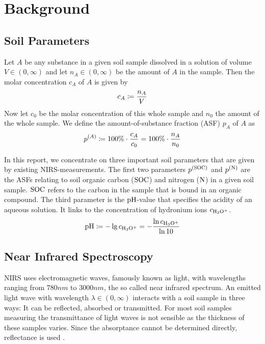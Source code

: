 \section{Background}
\label{sec:background}
	
	\subsection{Soil Parameters}
	\label{ssec:soil-parameters}
	
		Let $A$ be any substance in a given soil sample dissolved in a solution of volume $V\in(0,\infty)$ and let $n_A\in(0,\infty)$ be the amount of $A$ in the sample.
		Then the molar concentration $c_A$ of $A$ is given by
		\[
			c_A \coloneqq \frac{n_A}{V}
		\]
		Now let $c_0$ be the molar concentration of this whole sample and $n_0$ the amount of the whole sample.
		We define the amount-of-substance fraction (ASF) $p_A$ of $A$ as 
		\[
			p^{(A)} \coloneqq 100\%\cdot\frac{c_A}{c_0} = 100\% \cdot\frac{n_A}{n_0}
		\]

		In this report, we concentrate on three important soil parameters that are given by existing NIRS-measurements. \cite{agelet:10a, don:a}
		The first two parameters $p^{\mathrm{(SOC)}}$ and $p^{\mathrm{(N)}}$ are the ASFs relating to soil organic carbon ($\mathrm{SOC}$) and nitrogen ($\mathrm{N}$) in a given soil sample.
		$\mathrm{SOC}$ refers to the carbon in the sample that is bound in an organic compound.
		The third parameter is the $\mathrm{pH}$-value that specifies the acidity of an aqueous solution.
		It links to the concentration of hydronium ions $c_{\mathrm{H_3O^+}}$.
		\[
			\mathrm{pH} \coloneqq -\lg c_{\mathrm{H_3O^+}} = -\frac{\ln c_{\mathrm{H_3O^+}}}{\ln 10}
		\]
	

	\subsection{Near Infrared Spectroscopy}
	\label{ssec:nirs}
	
		NIRS uses electromagnetic waves, \cite[246]{agelet:10a}
		 famously known as light, with wavelengths ranging from $780\unit{nm}$ to $3000\unit{nm}$, the so called near infrared spectrum.
		An emitted light wave with wavelength $\lambda \in (0,\infty)$ interacts with a soil sample in three ways:
		It can be reflected, absorbed or transmitted.
		For most soil samples measuring the transmittance of light waves is not sensible as the thickness of these samples varies.
		Since the absorptance cannot be determined directly, reflectance is used \cite[247-8]{agelet:10a}.
		

